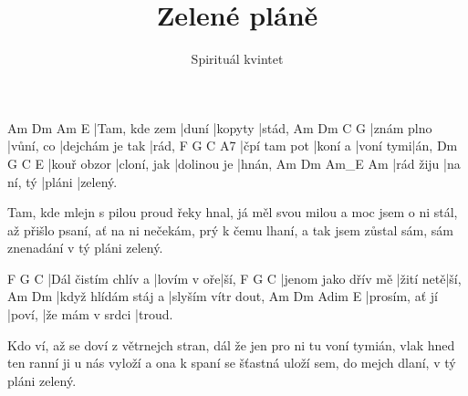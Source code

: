 \documentclass{song}
\title{Zelené pláně}
\author{Spirituál kvintet}
\begin{document}
\strophe
Am            Dm    Am      E
|Tam, kde zem |duní |kopyty |stád,
Am         Dm        C               G
|znám plno |vůní, co |dejchám je tak |rád,
F            G       C         A7
|čpí tam pot |koní a |voní tymi|án,
Dm          G           C           E
|kouř obzor |cloní, jak |dolinou je |hnán,
Am        Dm         Am_E   Am
|rád žiju |na ní, tý |pláni |zelený.
\endstrophe

\strophe*
Tam, kde mlejn s pilou proud řeky hnal,
já měl svou milou a moc jsem o ni stál,
až přišlo psaní, ať na ni nečekám,
prý k čemu lhaní, a tak jsem zůstal sám,
sám znenadání v tý pláni zelený.
\endstrophe

\strophe
F                   G           C
|Dál čistím chlív a |lovím v oře|ší,
F                   G         C
|jenom jako dřív mě |žití netě|ší,
Am                  Dm
|když hlídám stáj a |slyším vítr dout,
Am             Dm     Adim            E
|prosím, ať jí |poví, |že mám v srdci |troud.
\endstrophe

\strophe*
Kdo ví, až se doví z větrnejch stran,
dál že jen pro ni tu voní tymián,
vlak hned ten ranní ji u nás vyloží
a ona k spaní se šťastná uloží
sem, do mejch dlaní, v tý pláni zelený.
\endstrophe
\end{document}
